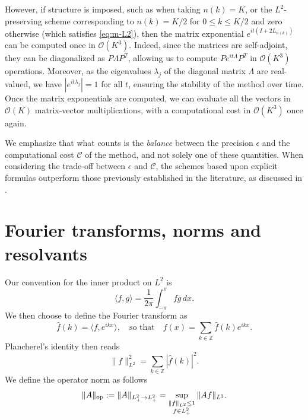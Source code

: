 \documentclass [11pt] {article}
\newcommand{\<}{\langle}
\renewcommand{\>}{\rangle}
\newcommand{\wh}[1]{\widehat{#1}}
\newcommand{\ol}[1]{\overline{#1}}
\newcommand\Z{\mathbb{Z}}
\newcommand{\op}{\textup{op}}
\begin{document}
However, if structure is imposed, such as when taking $n(k) = K$, or the $L^2$-preserving scheme corresponding to $n(k) = K/2$ for $0\le k\le K/2$ and zero otherwise (which satisfies \eqref{eq:m-L2}),
then the matrix exponential  $e^{it(I + 2L_{n(k)})}$ can be computed once in $ \mathcal O(K^3)$.
Indeed, 
since the matrices are self-adjoint, they can be diagonalized as $P\Lambda P^T$, allowing us to compute $Pe^{it\Lambda}P^T$ in $\mathcal O(K^3)$ operations. Moreover, as the eigenvalues $\lambda_j$ of the diagonal matrix $\Lambda$ are real-valued, we have $|e^{it\lambda_j}| = 1$ for all $t$, ensuring the stability of the method over time.
Once the matrix exponentials are computed, we can evaluate all the vectors in $\mathcal O(K)$ matrix-vector multiplications, with a computational cost in $\mathcal O(K^3)$ once again.

We emphasize that what counts is the {\it balance} between the precision $\epsilon$ and the computational cost $\mathcal{C}$ of the method, and not solely one of these quantities. When considering the trade-off between $\epsilon$ and $\mathcal{C}$, the schemes based upon explicit formulas outperform those previously established in the literature, as discussed in \cite[Section 4.2]{ABCD24}. 









\section{Fourier transforms, norms and resolvants}\label{sec:notation} %

Our convention for the inner product on $L^2$ is
\[
\langle f, g \rangle = \frac{1}{2\pi} \int_{-\pi}^{\pi} f\ol{g}\,dx.
\]
We then choose to define the Fourier transform as
\begin{equation*}
\wh{f}(k) = \langle f, e^{ikx} \rangle, \quad\text{so that}\quad f(x) = \sum_{k\in\Z} \wh{f}(k) e^{ikx}.
\end{equation*}
Plancherel's identity then reads
\begin{equation*}
\|f\|_{L^2}^2 = \sum_{k\in\Z} |\wh{f}(k)|^2.
\end{equation*}
%
We define the operator norm as follows
\[
\| A\|_{\op} := \| A\|_{L^2_{+} \to L^2_{+}} = \sup_{\substack{\| f\|_{L^2} \le 1 \\ f\in L^2_{+}}} \| Af\|_{L^2}.
\]
\end{document}

